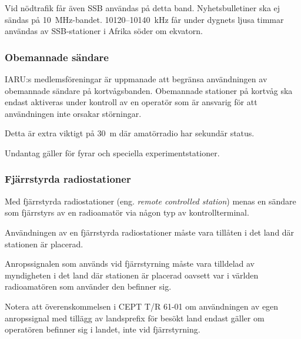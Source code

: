 Vid nödtrafik får även SSB användas på detta band.
Nyhetsbulletiner ska ej sändas på 10~MHz-bandet.
10120--10140~kHz får under dygnets ljusa timmar användas av
SSB-stationer i Afrika söder om ekvatorn.

\subsubsection{Obemannade sändare}

IARU:s medlemsföreningar är uppmanade att begränsa användningen av obemannade
sändare på kortvågsbanden.
Obemannade stationer på kortvåg ska endast aktiveras under kontroll av en
operatör som är ansvarig för att användningen inte orsakar störningar.

Detta är extra viktigt på 30~m där amatörradio har sekundär status.

Undantag gäller för fyrar och speciella experimentstationer.

\subsubsection{Fjärrstyrda radiostationer}

Med fjärrstyrda radiostationer (eng. \emph{remote controlled station}) menas en
sändare som fjärrstyrs av en radioamatör via någon typ av kontrollterminal.

Användningen av en fjärrstyrda radiostationer måste vara tillåten i det land där
stationen är placerad.

Anropssignalen som används vid fjärrstyrning måste vara tilldelad av myndigheten
i det land där stationen är placerad oavsett var i världen radioamatören som
använder den befinner sig.

Notera att överenskommelsen i CEPT T/R 61-01 \cite{TR6101} om användningen av
egen anropssignal med tillägg av landsprefix för besökt land endast gäller om
operatören befinner sig i landet, inte vid fjärrstyrning.
